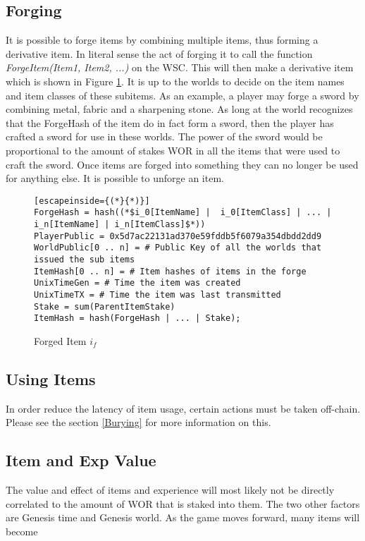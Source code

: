 \documentclass[runningheads,a4paper]{llncs}
\begin{document}
\subsection{Forging}
\label{Forging}
It is possible to forge items by combining multiple items, thus forming a derivative item. In literal sense the act of forging it to call the function \textit{ForgeItem(Item1, Item2, ...)} on the WSC. This will then make a derivative item which is shown in Figure \ref{ForgedItem}. It is up to the worlds to decide on the item names and item classes of these subitems. As an example, a player may forge a sword by combining metal, fabric and a sharpening stone. As long at the world recognizes that the ForgeHash of the item do in fact form a sword, then the player has crafted a sword for use in these worlds. The power of the sword would be proportional to the amount of stakes WOR in all the items that were used to craft the sword. Once items are forged into something they can no longer be used for anything else. It is possible to unforge an item.

\begin{figure}[H]
\centering
\caption{Forged Item $i_f$}
\label{ForgedItem}
\begin{lstlisting}[escapeinside={(*}{*)}]
ForgeHash = hash((*$i_0[ItemName] |  i_0[ItemClass] | ... | i_n[ItemName] | i_n[ItemClass]$*))
PlayerPublic = 0x5d7ac22131ad370e59fddb5f6079a354dbdd2dd9
WorldPublic[0 .. n] = # Public Key of all the worlds that issued the sub items
ItemHash[0 .. n] = # Item hashes of items in the forge
UnixTimeGen = # Time the item was created
UnixTimeTX = # Time the item was last transmitted
Stake = sum(ParentItemStake)
ItemHash = hash(ForgeHash | ... | Stake);
\end{lstlisting}
\end{figure}

\subsection{Using Items}
In order reduce the latency of item usage, certain actions must be taken off-chain. Please see the section \ref{Burying} for more information on this.

\subsection{Item and Exp Value}
The value and effect of items and experience will most likely not be directly correlated to the amount of WOR that is staked into them. The two other factors are Genesis time and Genesis world. As the game moves forward, many items will become 
\end{document}
